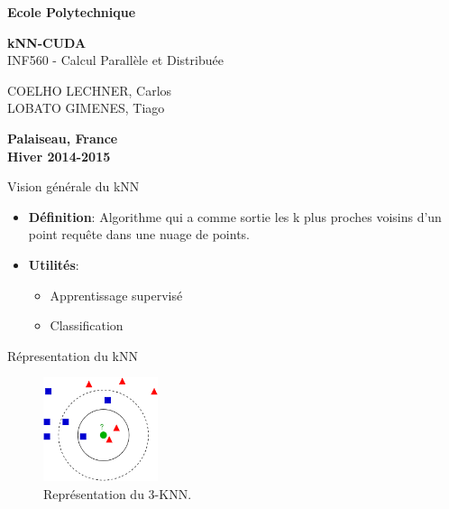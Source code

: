 \documentclass[12pt,a4paper]{beamer}
\begin{document}
\begin{frame}
\begin{center}
{\Huge \bf Ecole Polytechnique}\\

\vspace{1cm}

{\LARGE{\bf kNN-CUDA\\ }}
INF560 - Calcul Parallèle et Distribuée

\vspace{1cm}
COELHO LECHNER, Carlos\\
LOBATO GIMENES, Tiago\\
\end{center}

\begin{center}
\textbf{Palaiseau, France \\  Hiver 2014-2015}
\end{center}
\end{frame}

\begin{frame}{Vision générale du kNN}
\begin{itemize}
\item \textbf{Définition}: Algorithme qui a comme sortie les k plus proches voisins d'un point requête dans une nuage de points. 
\item \textbf{Utilités}: 
	\begin{itemize}
	\item Apprentissage supervisé
	\item Classification
	\end{itemize}
\end{itemize}
\end{frame}

\begin{frame}{Répresentation du kNN}
\begin{figure}
\centering
\includegraphics[width=0.3\textwidth]{../figures/KNN.png}
\caption{\label{fig:3KNN} Représentation du 3-KNN.}
\end{figure}
\end{frame}
\end{document}
